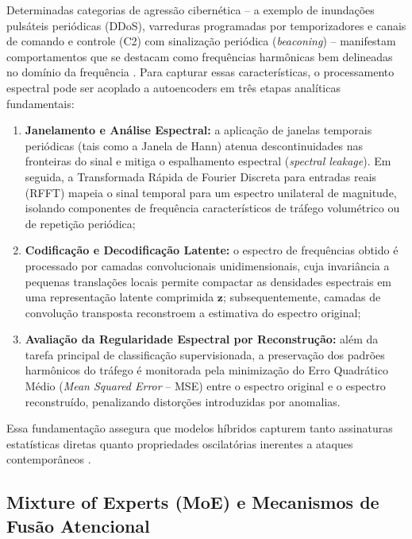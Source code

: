 Determinadas categorias de agressão cibernética -- a exemplo de inundações pulsáteis periódicas (DDoS), varreduras programadas por temporizadores e canais de comando e controle (C2) com sinalização periódica (\emph{beaconing}) -- manifestam comportamentos que se destacam como frequências harmônicas bem delineadas no domínio da frequência \cite{ugr162021}. Para capturar essas características, o processamento espectral pode ser acoplado a autoencoders em três etapas analíticas fundamentais:

\begin{enumerate}
    \item \textbf{Janelamento e Análise Espectral:} a aplicação de janelas temporais periódicas (tais como a Janela de Hann) atenua descontinuidades nas fronteiras do sinal e mitiga o espalhamento espectral (\emph{spectral leakage}). Em seguida, a Transformada Rápida de Fourier Discreta para entradas reais (RFFT) mapeia o sinal temporal para um espectro unilateral de magnitude, isolando componentes de frequência característicos de tráfego volumétrico ou de repetição periódica;
    
    \item \textbf{Codificação e Decodificação Latente:} o espectro de frequências obtido é processado por camadas convolucionais unidimensionais, cuja invariância a pequenas translações locais permite compactar as densidades espectrais em uma representação latente comprimida $\mathbf{z}$; subsequentemente, camadas de convolução transposta reconstroem a estimativa do espectro original;
    
    \item \textbf{Avaliação da Regularidade Espectral por Reconstrução:} além da tarefa principal de classificação supervisionada, a preservação dos padrões harmônicos do tráfego é monitorada pela minimização do Erro Quadrático Médio (\emph{Mean Squared Error} -- MSE) entre o espectro original e o espectro reconstruído, penalizando distorções introduzidas por anomalias.
\end{enumerate}

Essa fundamentação assegura que modelos híbridos capturem tanto assinaturas estatísticas diretas quanto propriedades oscilatórias inerentes a ataques contemporâneos \cite{borgioli2024cae}.

\subsection{Mixture of Experts (MoE) e Mecanismos de Fusão Atencional}
\label{subsec:moe_e_atencao}

